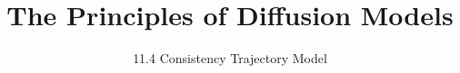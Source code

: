 
\title{The Principles of Diffusion Models}
\subtitle{11.4 Consistency Trajectory Model}


\begin{frame}
    \titlepage
\end{frame}


